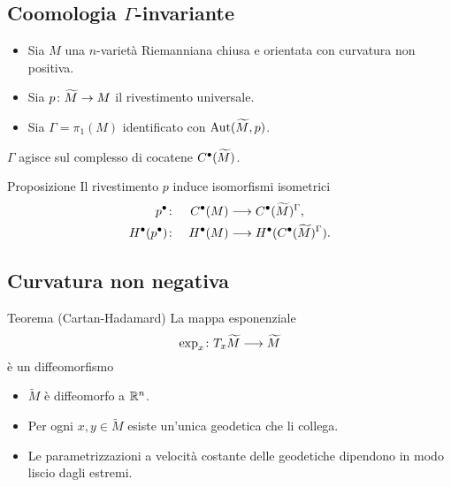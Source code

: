 \documentclass{beamer}
\begin{document}
\subsection{Coomologia $\Gamma$-invariante}
\begin{frame}{\secname}{\subsecname}
\begin{itemize}
\item Sia $M$ una $n$-varietà Riemanniana chiusa e orientata con curvatura non positiva.
\item Sia $\map{p}{\widetilde M}{M}$ il rivestimento universale.
\item Sia $\Gamma=\pi_1(M)$ identificato con $\operatorname{Aut}(\widetilde M,p)$.
\end{itemize}

$\Gamma$ agisce sul complesso di cocatene $C^\bullet(\widetilde M)$.
\begin{block}{Proposizione}
Il rivestimento $p$ induce isomorfismi isometrici
\begin{alignat*}{2}
p^\bullet\colon&&C^\bullet(M)&\longrightarrow C^\bullet(\widetilde M)^\Gamma,\\
H^\bullet(p^\bullet)\colon&&H^\bullet(M)&\longrightarrow H^\bullet(C^\bullet(\widetilde M)^\Gamma).
\end{alignat*}
\end{block}
\end{frame}
\subsection{Curvatura non negativa}
\begin{frame}{\secname}{\subsecname}
\begin{block}{Teorema (Cartan-Hadamard)}
La mappa esponenziale
\[
\map{\exp_x}{T_x\widetilde M}{\widetilde M}
\]
è un diffeomorfismo
\end{block}
\begin{itemize}
\item $\widetilde M$ è diffeomorfo a $\mathbb{R}^n$.
\item Per ogni $x,y\in\widetilde M$ esiste un'unica geodetica che li collega.
\item Le parametrizzazioni a velocità costante delle geodetiche dipendono in modo liscio dagli estremi.
\end{itemize}
\end{frame}
\end{document}

